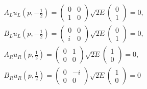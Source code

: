 \documentclass[11pt]{article}
\begin{document}
\section{ }
\begin{eqnarray}
    &&A_L u_L (p,-\frac{1}{2}) = 
    \begin{pmatrix}
        0 & 0 \\
        1 & 0
    \end{pmatrix}
    \sqrt{2E}
    \begin{pmatrix}
        0 \\ 1
    \end{pmatrix}
    =0 ,\\
    &&B_L u_L (p,-\frac{1}{2}) = 
    \begin{pmatrix}
        0 & 0 \\
        i & 0
    \end{pmatrix}
    \sqrt{2E}
    \begin{pmatrix}
        0 \\ 1
    \end{pmatrix}
    =0 ,\\
    &&A_R u_R (p,\frac{1}{2}) = 
    \begin{pmatrix}
        0 & 1 \\
        0 & 0
    \end{pmatrix}
    \sqrt{2E}
    \begin{pmatrix}
        1 \\ 0
    \end{pmatrix}
    =0 ,\\
    &&B_R u_R (p,\frac{1}{2}) = 
    \begin{pmatrix}
        0 & -i \\
        0 & 0
    \end{pmatrix}
    \sqrt{2E}
    \begin{pmatrix}
        1 \\ 0
    \end{pmatrix}
    =0
\end{eqnarray}
\end{document}
